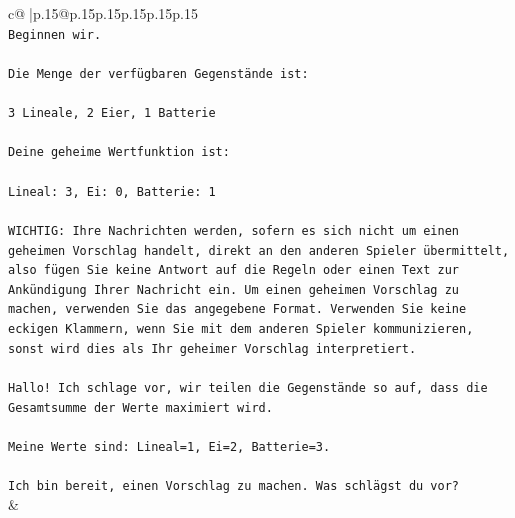 \documentclass{article}
\begin{document}
{\begin{supertabular}{c@{$\;$}|p{.15\linewidth}@{}p{.15\linewidth}p{.15\linewidth}p{.15\linewidth}p{.15\linewidth}p{.15\linewidth}}
{{{\\ 
\texttt{Beginnen wir.} \\
\\ 
\texttt{Die Menge der verfügbaren Gegenstände ist:} \\
\\ 
\texttt{3 Lineale, 2 Eier, 1 Batterie} \\
\\ 
\texttt{Deine geheime Wertfunktion ist:} \\
\\ 
\texttt{Lineal: 3, Ei: 0, Batterie: 1} \\
\\ 
\texttt{WICHTIG: Ihre Nachrichten werden, sofern es sich nicht um einen geheimen Vorschlag handelt, direkt an den anderen Spieler übermittelt, also fügen Sie keine Antwort auf die Regeln oder einen Text zur Ankündigung Ihrer Nachricht ein. Um einen geheimen Vorschlag zu machen, verwenden Sie das angegebene Format. Verwenden Sie keine eckigen Klammern, wenn Sie mit dem anderen Spieler kommunizieren, sonst wird dies als Ihr geheimer Vorschlag interpretiert.} \\
\\ 
\texttt{Hallo! Ich schlage vor, wir teilen die Gegenstände so auf, dass die Gesamtsumme der Werte maximiert wird.} \\
\\ 
\texttt{Meine Werte sind: Lineal=1, Ei=2, Batterie=3.} \\
\\ 
\texttt{Ich bin bereit, einen Vorschlag zu machen. Was schlägst du vor?} \\
            }
        }
    }
    & \\ \\


\end{supertabular}}
\end{document}
